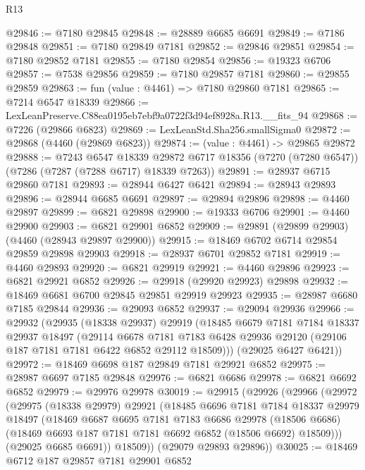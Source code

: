 \begin{lexlean}{R13}
\begin{coremodule}
@29846 := @7180 @29845
@29848 := @28889 @6685 @6691
@29849 := @7186 @29848
@29851 := @7180 @29849 @7181
@29852 := @29846 @29851
@29854 := @7180 @29852 @7181
@29855 := @7180 @29854
@29856 := @19323 @6706
@29857 := @7538 @29856
@29859 := @7180 @29857 @7181
@29860 := @29855 @29859
@29863 := fun (value : @4461) => @7180 @29860 @7181
@29865 := @7214 @6547 @18339
@29866 := LexLeanPreserve.C88ea0195eb7ebf9a0722f3d94ef8928a.R13.__fits_94
@29868 := @7226 (@29866 @6823)
@29869 := LexLeanStd.Sha256.smallSigma0
@29872 := @29868 (@4460 (@29869 @6823))
@29874 := (value : @4461) -> @29865 @29872
@29888 := @7243
    @6547
    @18339
    @29872
    @6717
    @18356
    (@7270 (@7280 @6547))
    (@7286 (@7287 (@7288 @6717) @18339 @7263))
@29891 := @28937 @6715 @29860 @7181
@29893 := @28944 @6427 @6421
@29894 := @28943 @29893
@29896 := @28944 @6685 @6691
@29897 := @29894 @29896
@29898 := @4460 @29897
@29899 := @6821 @29898
@29900 := @19333 @6706
@29901 := @4460 @29900
@29903 := @6821 @29901 @6852
@29909 := @29891 (@29899 @29903) (@4460 (@28943 @29897 @29900))
@29915 := @18469 @6702 @6714 @29854 @29859 @29898 @29903
@29918 := @28937 @6701 @29852 @7181
@29919 := @4460 @29893
@29920 := @6821 @29919
@29921 := @4460 @29896
@29923 := @6821 @29921 @6852
@29926 := @29918 (@29920 @29923) @29898
@29932 := @18469 @6681 @6700 @29845 @29851 @29919 @29923
@29935 := @28987 @6680 @7185 @29844
@29936 := @29093 @6852
@29937 := @29094 @29936
@29966 := @29932
    (@29935
      (@18338 @29937)
      @29919
      (@18485
        @6679
        @7181
        @7184
        @18337
        @29937
        @18497
        (@29114
          @6678
          @7181
          @7183
          @6428
          @29936
          @29120
          (@29106 @187 @7181 @7181 @6422 @6852 @29112 @18509)))
      (@29025 @6427 @6421))
@29972 := @18469 @6698 @187 @29849 @7181 @29921 @6852
@29975 := @28987 @6697 @7185 @29848
@29976 := @6821 @6686
@29978 := @6821 @6692 @6852
@29979 := @29976 @29978
@30019 := @29915
    (@29926
      (@29966
        (@29972
          (@29975
            (@18338 @29979)
            @29921
            (@18485
              @6696
              @7181
              @7184
              @18337
              @29979
              @18497
              (@18469
                @6687
                @6695
                @7181
                @7183
                @6686
                @29978
                (@18506 @6686)
                (@18469 @6693 @187 @7181 @7181 @6692 @6852 (@18506 @6692) @18509)))
            (@29025 @6685 @6691))
          @18509))
      (@29079 @29893 @29896))
@30025 := @18469 @6712 @187 @29857 @7181 @29901 @6852

\end{coremodule}
\end{lexlean}
